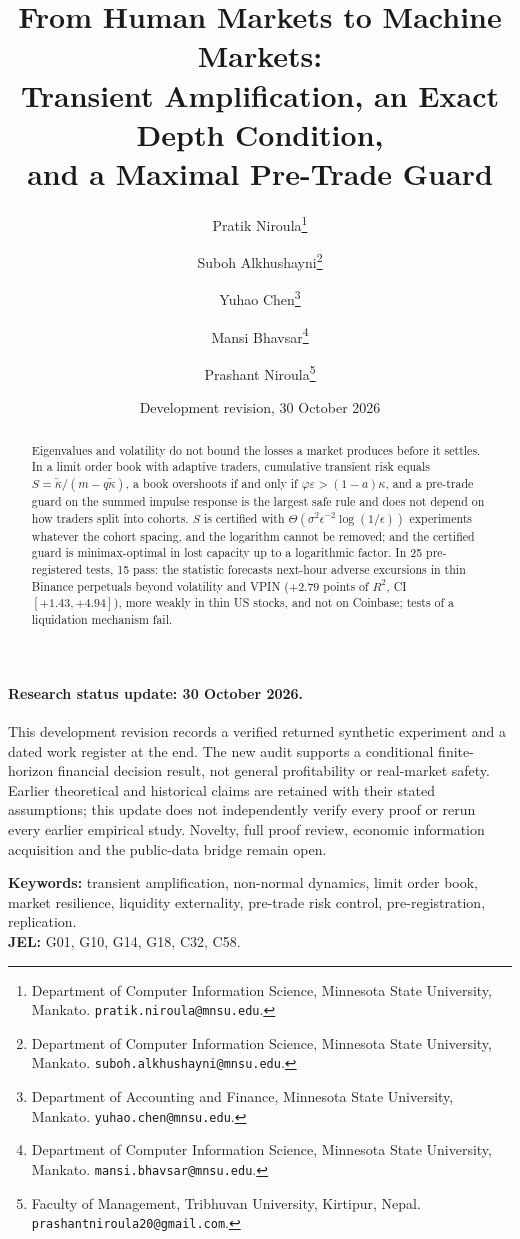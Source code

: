 \documentclass[12pt]{article}
\title{From Human Markets to Machine Markets:\\
Transient Amplification, an Exact Depth Condition,\\ and a Maximal Pre-Trade Guard}
\author{Pratik Niroula\thanks{Department of Computer Information Science, Minnesota State University, Mankato. \texttt{pratik.niroula@mnsu.edu}.}
\and Suboh Alkhushayni\thanks{Department of Computer Information Science, Minnesota State University, Mankato. \texttt{suboh.alkhushayni@mnsu.edu}.}
\and Yuhao Chen\thanks{Department of Accounting and Finance, Minnesota State University, Mankato. \texttt{yuhao.chen@mnsu.edu}.}
\and Mansi Bhavsar\thanks{Department of Computer Information Science, Minnesota State University, Mankato. \texttt{mansi.bhavsar@mnsu.edu}.}
\and Prashant Niroula\thanks{Faculty of Management, Tribhuvan University, Kirtipur, Nepal. \texttt{prashantniroula20@gmail.com}.}}
\date{Development revision, 30 October 2026}
\theoremstyle{definition}
\theoremstyle{remark}
\begin{document}
\maketitle
\thispagestyle{empty}

\begin{abstract}
\noindent Eigenvalues and volatility do not bound the losses a market produces before it settles. In a limit order book with adaptive traders, cumulative transient risk equals $S=\tilde\kappa/(m-q\tilde\kappa)$, a book overshoots if and only if $\varphi\varepsilon>(1-a)\kappa$, and a pre-trade guard on the summed impulse response is the largest safe rule and does not depend on how traders split into cohorts. $S$ is certified with $\Theta(\sigma^2\epsilon^{-2}\log(1/\epsilon))$ experiments whatever the cohort spacing, and the logarithm cannot be removed; and the certified guard is minimax-optimal in lost capacity up to a logarithmic factor. In 25 pre-registered tests, 15 pass: the statistic forecasts next-hour adverse excursions in thin Binance perpetuals beyond volatility and VPIN ($+2.79$ points of $R^2$, CI $[+1.43,+4.94]$), more weakly in thin US stocks, and not on Coinbase; tests of a liquidation mechanism fail.
\end{abstract}

\paragraph{Research status update: 30 October 2026.}
This development revision records a verified returned synthetic experiment and
a dated work register at the end. The new audit supports a conditional
finite-horizon financial decision result, not general profitability or
real-market safety. Earlier theoretical and historical claims are retained
with their stated assumptions; this update does not independently verify every
proof or rerun every earlier empirical study. Novelty, full proof review,
economic information acquisition and the public-data bridge remain open.


\noindent\textbf{Keywords:} transient amplification, non-normal dynamics, limit order book, market resilience, liquidity externality, pre-trade risk control, pre-registration, replication.\\
\textbf{JEL:} G01, G10, G14, G18, C32, C58.
\end{document}
